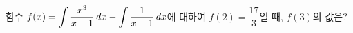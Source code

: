 함수 $f(x)=\displaystyle\int\dfrac{x^3}{x-1}\mkern3mu dx-\int\dfrac{1}{x-1}\mkern3mu dx$에 대하여 $f(2)=\dfrac{17}{3}$일 때, $f(3)$의 값은?
